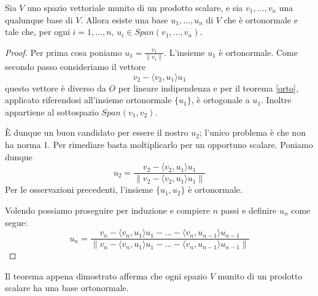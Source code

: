 \begin{theorem}
	Sia $V$ uno spazio vettoriale munito di un prodotto scalare, e sia
	$v_1, \dots, v_n$ una qualunque base di $V$. Allora esiste una base
	$u_1, \dots, u_n$ di $V$ che \`e ortonormale e tale che, per ogni
	$i = 1, \dots, n$, $u_i \in Span(v_1, \dots, v_n)$.
	\begin{proof}
		Per prima cosa poniamo $u_1 = \frac{v_1}{\| v_1 \|}$. L'insieme ${u_1}$ \`e ortonormale.
		Come secondo passo consideriamo il vettore
		\[
			v_2 - \langle v_2, u_1 \rangle u_1
		\]
		questo vettore \`e diverso da $O$ per lineare indipendenza e per il teorema \ref{orto},
		applicato riferendosi all'insieme ortonormale $\{ u_1 \}$, \`e ortogonale a $u_1$. Inoltre
		appartiene al sottospazio $Span(v_1, v_2)$.

		\`E dunque un buon candidato per essere il nostro $u_2$; l'unico problema \`e che non ha
		norma 1. Per rimediare basta moltiplicarlo per un opportuno scalare. Poniamo dunque
		\[
			u_2 = \frac{v_2 - \langle v_2, u_1 \rangle u_1}
			{\| v_2 - \langle v_2, u_1 \rangle u_1\|}
		\]
		Per le osservazioni precedenti, l'insieme $\{ u_1, u_2 \}$ \`e ortonormale.

		Volendo possiamo proseguire per induzione e compiere $n$ passi e definire $u_n$ come segue:
		\[
			u_n = \frac{v_n - \langle v_n, u_1 \rangle u_1 - \dots -
				\langle v_n, u_{n-1} \rangle u_{n-1}}
			{\| v_n - \langle v_n, u_1 \rangle u_1 - \dots - \langle v_n, u_{n-1} \rangle u_{n-1} \|}
		\]
	\end{proof}
\end{theorem}

Il teorema appena dimostrato afferma che ogni spazio $V$ munito di un prodotto
scalare ha una base ortonormale.

